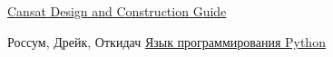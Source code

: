 \begin{thebibliography}{99}

\href{http://www.cansatcompetition.com/docs/cansat_construction.pdf}{Cansat Design and Construction Guide}

Россум, Дрейк, Откидач \href{http://rus-linux.net/MyLDP/BOOKS/python.pdf}{Язык программирования Python}

\end{thebibliography}
